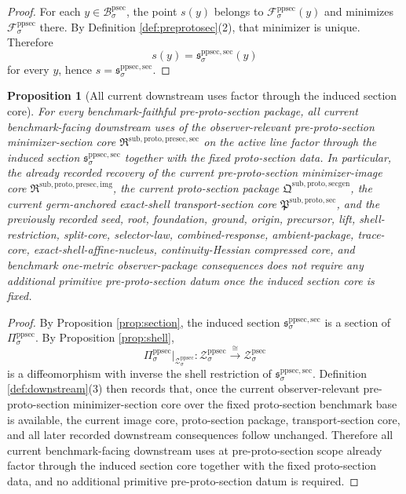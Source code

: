 \documentclass[11pt]{article}
\newcommand{\ProtoSectionCore}{\mathfrak P^{\mathrm{sub,proto,sec}}}
\newcommand{\ProtoSectionPackage}{\mathfrak Q^{\mathrm{sub,proto,secgen}}}
\newcommand{\ProtoSectionBody}[1]{\mathcal B_{#1}^{\mathrm{psec}}}
\newcommand{\ProtoSectionShell}[1]{\mathcal Z_{#1}^{\mathrm{psec}}}
\newcommand{\PreProtoSectionProj}[1]{\Pi_{#1}^{\mathrm{ppsec}}}
\newcommand{\PreProtoSectionFiber}[2]{\mathcal F_{#1}^{\mathrm{ppsec}}(#2)}
\newcommand{\PreProtoSectionFunctional}[1]{\mathscr F_{#1}^{\mathrm{ppsec}}}
\newcommand{\PreProtoSectionShell}[1]{\mathcal Z_{#1}^{\mathrm{ppsec}}}
\newcommand{\PreProtoSectionImageCore}{\mathfrak R^{\mathrm{sub,proto,presec,img}}}
\newcommand{\PreProtoSectionMinSectionCore}{\mathfrak R^{\mathrm{sub,proto,presec,sec}}}
\newcommand{\PreProtoSectionMinSection}[1]{\mathfrak s_{#1}^{\mathrm{ppsec,sec}}}
\newtheorem{proposition}{Proposition}
\begin{document}
\begin{proof}
For each \(y\in\ProtoSectionBody{\sigma}\), the point \(s(y)\) belongs to \(\PreProtoSectionFiber{\sigma}{y}\) and minimizes \(\PreProtoSectionFunctional{\sigma}\) there. By Definition \ref{def:preprotosec}(2), that minimizer is unique. Therefore
\[
s(y)=\PreProtoSectionMinSection{\sigma}(y)
\]
for every \(y\), hence \(s=\PreProtoSectionMinSection{\sigma}\).
\end{proof}

\begin{proposition}[All current downstream uses factor through the induced section core]
\label{prop:downstream}
For every benchmark-faithful pre-proto-section package, all current benchmark-facing downstream uses of the observer-relevant pre-proto-section minimizer-section core \(\PreProtoSectionMinSectionCore\) on the active line factor through the induced section \(\PreProtoSectionMinSection{\sigma}\) together with the fixed proto-section data. In particular, the already recorded recovery of the current pre-proto-section minimizer-image core \(\PreProtoSectionImageCore\), the current proto-section package \(\ProtoSectionPackage\), the current germ-anchored exact-shell transport-section core \(\ProtoSectionCore\), and the previously recorded seed, root, foundation, ground, origin, precursor, lift, shell-restriction, split-core, selector-law, combined-response, ambient-package, trace-core, exact-shell-affine-nucleus, continuity-Hessian compressed core, and benchmark one-metric observer-package consequences does not require any additional primitive pre-proto-section datum once the induced section core is fixed.
\end{proposition}

\begin{proof}
By Proposition \ref{prop:section}, the induced section \(\PreProtoSectionMinSection{\sigma}\) is a section of \(\PreProtoSectionProj{\sigma}\). By Proposition \ref{prop:shell},
\[
\PreProtoSectionProj{\sigma}\big|_{\PreProtoSectionShell{\sigma}}
:
\PreProtoSectionShell{\sigma}\xrightarrow{\cong}\ProtoSectionShell{\sigma}
\]
is a diffeomorphism with inverse the shell restriction of \(\PreProtoSectionMinSection{\sigma}\). Definition \ref{def:downstream}(3) then records that, once the current observer-relevant pre-proto-section minimizer-section core over the fixed proto-section benchmark base is available, the current image core, proto-section package, transport-section core, and all later recorded downstream consequences follow unchanged. Therefore all current benchmark-facing downstream uses at pre-proto-section scope already factor through the induced section core together with the fixed proto-section data, and no additional primitive pre-proto-section datum is required.
\end{proof}
\end{document}
